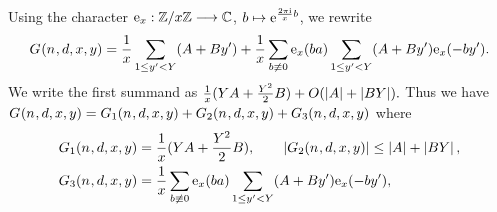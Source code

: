   Using the character
    ${\mathrm{e}_x} : \mathbb{Z}/x\mathbb{Z}  \longrightarrow \mathbb{C}$, $
    b  \mapsto \mathrm{e}^{\frac{2\pi\mathrm{i}}{x} b}$, 
  we rewrite
  \begin{align*}
    \TheQuantityOf{\Size,\TheDivisor,\LeftA,\RightA}
   =
      \frac{1}{\LeftA}
      \Sum[1\leq\RightB<\UpperBound]{
      (\ConstantTerm+\LinearTerm\RightB)
      }
      +
      \frac{1}{\LeftA}
      \Sum[\ModRingElement\not\congruent 0]{
      \TheCharOf{\ModRingElement\TheCongruenceClass}
      \Sum[1\leq\RightB<\UpperBound]{
      (\ConstantTerm+\LinearTerm\RightB)\TheCharOf{-\ModRingElement\RightB}
      }
      }.
  \end{align*}
We write the first summand as   $ \frac{1}{\LeftA}
      (\UpperBound\ConstantTerm+\frac{\UpperBound^2}{2}\LinearTerm) + O( \AbsValueOf{\ConstantTerm}
    +
    \AbsValueOf{\LinearTerm\UpperBound}). $
%
  Thus we have
    $ \TheQuantityOf{\Size,\TheDivisor,\LeftA,\RightA} =
    \TheQuantityOf[1]{\Size,\TheDivisor,\LeftA,\RightA} +
    \TheQuantityOf[2]{\Size,\TheDivisor,\LeftA,\RightA} +
    \TheQuantityOf[3]{\Size,\TheDivisor,\LeftA,\RightA}$
  where
  \begin{align*}
    \TheQuantityOf[1]{\Size,\TheDivisor,\LeftA,\RightA}
    &=
      \frac{1}{\LeftA}
      (\UpperBound\ConstantTerm+\frac{\UpperBound^2}{2}\LinearTerm), \quad\quad 
      \AbsValueOf{\TheQuantityOf[2]{\Size,\TheDivisor,\LeftA,\RightA}}
      \leq \AbsValueOf{\ConstantTerm}+ \AbsValueOf{\LinearTerm\UpperBound},
    \\
      \TheQuantityOf[3]{\Size,\TheDivisor,\LeftA,\RightA}
    &=
      \frac{1}{\LeftA}
      \Sum[\ModRingElement\not\congruent 0]{
      \TheCharOf{\ModRingElement\TheCongruenceClass}
      \Sum[1\leq\RightB<\UpperBound]{
      (\ConstantTerm+\LinearTerm\RightB)\TheCharOf{-\ModRingElement\RightB}
      }
      }
      ,
  \end{align*}
